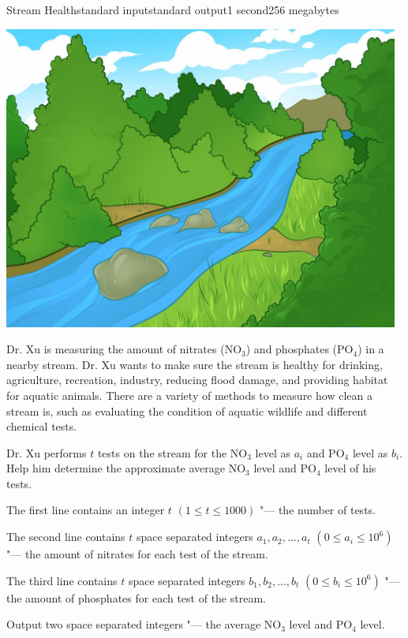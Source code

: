 \begin{problem}{Stream Health}{standard input}{standard output}{1 second}{256 megabytes}

\begin{center}
  \includegraphics[height=10cm]{45827.png} \\
\end{center}

Dr. Xu is measuring the amount of nitrates ($\text{NO}_3$) and phosphates ($\text{PO}_4$) in a nearby stream. Dr. Xu wants to make sure the stream is healthy for drinking, agriculture, recreation, industry, reducing flood damage, and providing habitat for aquatic animals. There are a variety of methods to measure how clean a stream is, such as evaluating the condition of aquatic wildlife and different chemical tests.


Dr. Xu performs $t$ tests on the stream for the $\text{NO}_3$ level as $a_i$ and $\text{PO}_4$ level as $b_i$. Help him determine the approximate average $\text{NO}_3$ level and $\text{PO}_4$ level of his tests.

\InputFile
The first line contains an integer $t$ $(1\le t\le 1000)$ "--- the number of tests.


The second line contains $t$ space separated integers $a_1,a_2,...,a_t$ $(0\le a_i\le 10^6)$ "--- the amount of nitrates for each test of the stream.

The third line contains $t$ space separated integers $b_1,b_2,...,b_t$ $(0\le b_i\le 10^6)$ "--- the amount of phosphates for each test of the stream.

\OutputFile
Output two space separated integers "--- the average $\text{NO}_3$ level and $\text{PO}_4$ level.



\end{problem}
